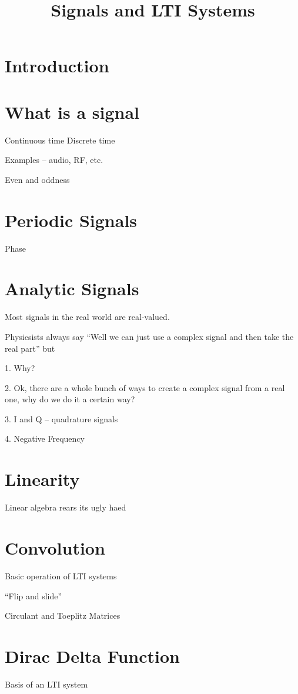 
\title{Signals and LTI Systems}


\section{Introduction}



\section{What is a signal }
Continuous time
Discrete time

Examples -- audio, RF, etc. 

Even and oddness



\section{Periodic Signals}
Phase


\section{Analytic Signals}
Most signals in the real world are real-valued. 

Physicsists always say ``Well we can just use a complex signal and
then take the real part'' but

1. Why? 

2. Ok, there are a whole bunch of ways to create a complex signal from
a real one, why do we do it a certain way? 

3. I and Q -- quadrature signals

4. Negative Frequency

\section{Linearity} 
Linear algebra rears its ugly haed 

\section{Convolution}
Basic operation of LTI systems

``Flip and slide'' 

Circulant and Toeplitz Matrices

\section{Dirac Delta Function}

Basis of an LTI system

